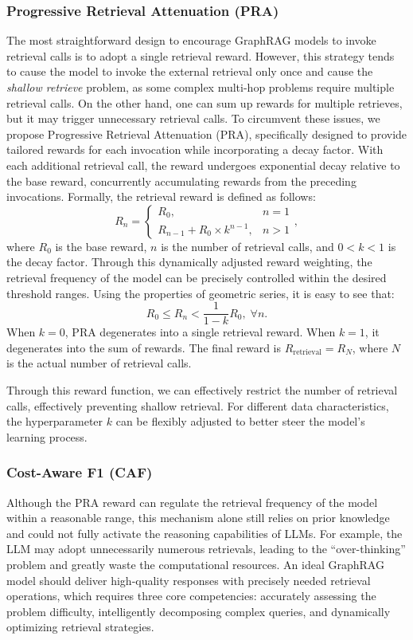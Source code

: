 \subsubsection{Progressive Retrieval Attenuation (PRA)}
The most straightforward design to encourage GraphRAG models to invoke retrieval calls is to adopt a single retrieval reward. However, this strategy tends to cause the model to invoke the external retrieval only once and cause the \textit{shallow retrieve} problem, as some complex multi-hop problems require multiple retrieval calls. On the other hand, one can sum up rewards for multiple retrieves, but it may trigger unnecessary retrieval calls. To circumvent these issues, we propose Progressive Retrieval Attenuation (PRA), specifically designed to provide tailored rewards for each invocation while incorporating a decay factor. With each additional retrieval call, the reward undergoes exponential decay relative to the base reward, concurrently accumulating rewards from the preceding invocations. Formally, the retrieval reward is defined as follows:
\begin{equation}\label{eq:PRA}
   R_n = 
   \begin{cases}
      R_{0}, & n=1 \\
      R_{n-1} + R_{0} \times k^{n-1}, & n>1 
   \end{cases},
   \end{equation}
where $R_0$ is the base reward, $n$ is the number of retrieval calls, and $0 < k < 1$ is the decay factor. 
Through this dynamically adjusted reward weighting, the retrieval frequency of the model can be precisely controlled within the desired threshold ranges. Using the properties of geometric series, it is easy to see that:
\begin{equation}
    R_0 \leq R_n < \frac{1}{1-k} R_0, \; \forall n.
\end{equation}
When $k=0$, PRA degenerates into a single retrieval reward. When $k=1$, it degenerates into the sum of rewards. The final reward is $R_{\text{retrieval}} = R_N$, where $N$ is the actual number of retrieval calls. 

Through this reward function, we can effectively restrict the number of retrieval calls, effectively preventing shallow retrieval. For different data characteristics, the hyperparameter $k$ can be flexibly adjusted to better steer the model's learning process.

\subsubsection{Cost-Aware F1 (CAF)}\label{sec:CAF}
Although the PRA reward can regulate the retrieval frequency of the model within a reasonable range, this mechanism alone still relies on prior knowledge and could not fully activate the reasoning capabilities of LLMs. For example, the LLM may adopt unnecessarily numerous retrievals, leading to the ``over-thinking'' problem and greatly waste the computational resources.   
An ideal GraphRAG model should deliver high-quality responses with precisely needed retrieval operations, which requires three core competencies: accurately assessing the problem difficulty, intelligently decomposing complex queries, and dynamically optimizing retrieval strategies.  

